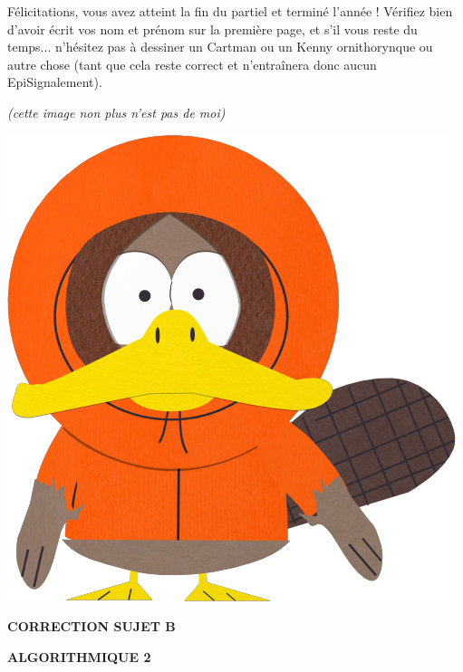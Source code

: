 \documentclass[11pt,a4paper]{article}
\newcommand{\TitreMatiere}{Algorithmique 2}
\begin{document}
\noindent Félicitations, vous avez atteint la fin du partiel et terminé l'année !
Vérifiez bien d'avoir écrit vos nom et prénom sur la première page, et s'il vous reste du temps... n'hésitez pas à dessiner un Cartman ou un Kenny ornithorynque ou autre chose (tant que cela reste correct et n'entraînera donc aucun EpiSignalement).

\begin{center}

{\small \textit{(cette image non plus n'est pas de moi)} }

\medskip

\includegraphics[scale=0.2]{img/kenny-mccormick_platypus.png}

\end{center}

\clearpage



\vfillFirst

\begin{center}

\begin{LARGE}
\textbf{CORRECTION SUJET B}

\bigskip

\textbf{\MakeUppercase{\TitreMatiere}}
\end{LARGE}

\end{center}

\vfillLast
\end{document}
